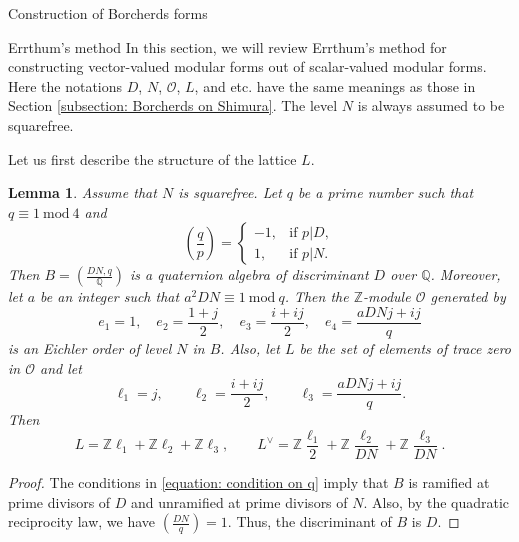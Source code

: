 \documentclass{amsart}
\newcounter{lemma}
\newtheorem{Lemma}[lemma]{Lemma}
\theoremstyle{definition}
\def\O{\mathcal O}
\def\Q{\mathbb Q}
\def\Z{\mathbb Z}
\def\mod{\  \mathrm{mod}\ }
\def\JS#1#2{\left(\frac{#1}{#2}\right)}
\begin{document}
\begin{section}{Construction of Borcherds forms}
\label{section: construction}

\begin{subsection}{Errthum's method}
  In this section, we will review Errthum's method \cite{Errthum} for
  constructing vector-valued modular forms out of scalar-valued
  modular forms. Here the notations $D$, $N$, $\O$, $L$, and etc. have
  the same meanings as those in Section \ref{subsection: Borcherds on
    Shimura}. The level $N$ is always assumed to be squarefree.

  Let us first describe the structure of the lattice $L$.

\begin{Lemma} \label{lemma: basis for O}
  Assume that $N$ is squarefree.
  Let $q$ be a prime number such that $q\equiv 1\mod 4$ and
  \begin{equation} \label{equation: condition on q}
    \JS qp=\begin{cases}
    -1, &\text{if }p|D, \\
     1, &\text{if }p|N. \end{cases}
  \end{equation}
  Then $B=\JS{DN,q}\Q$ is a quaternion algebra of discriminant $D$ over
  $\Q$. Moreover, let $a$ be an integer such that $a^2DN\equiv 1\mod
  q$. Then the $\Z$-module $\O$ generated by
  \begin{equation} \label{equation: ei}
    e_1=1, \quad e_2=\frac{1+j}2, \quad e_3=\frac{i+ij}2, \quad
    e_4=\frac{aDNj+ij}q
  \end{equation}
  is an Eichler order of level $N$ in $B$. Also, let $L$ be the set of
  elements of trace zero in $\O$ and let
  \begin{equation} \label{equation: ell i}
    \ell_1=j, \qquad \ell_2=\frac{i+ij}2, \qquad
    \ell_3=\frac{aDNj+ij}q.
  \end{equation}
  Then
  $$
    L=\Z\ell_1+\Z\ell_2+\Z\ell_3, \qquad
    L^\vee=\Z\frac{\ell_1}2+\Z\frac{\ell_2}{DN}+\Z\frac{\ell_3}{DN}.
  $$
\end{Lemma}

\begin{proof} The conditions in \eqref{equation: condition on q} imply
  that $B$ is ramified at prime divisors of $D$ and unramified at
  prime divisors of $N$. Also, by the quadratic reciprocity law, we
  have $\JS{DN}q=1$. Thus, the discriminant of $B$ is $D$.


\end{proof}
\end{subsection}
\end{section}
\end{document}
